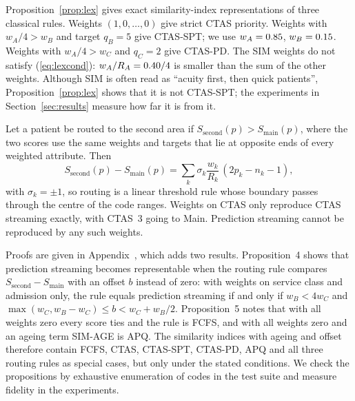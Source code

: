 Proposition~\ref{prop:lex} gives exact similarity-index representations of three classical rules. Weights $(1,0,\dots,0)$ give strict CTAS priority. Weights with $w_A/4>w_B$ and target $q_B=5$ give CTAS-SPT; we use $w_A=0.85$, $w_B=0.15$. Weights with $w_A/4>w_C$ and $q_C=2$ give CTAS-PD. The SIM weights do not satisfy (\ref{eq:lexcond}): $w_A/R_A=0.40/4$ is smaller than the sum of the other weights. Although SIM is often read as ``acuity first, then quick patients'', Proposition~\ref{prop:lex} shows that it is not CTAS-SPT; the experiments in Section~\ref{sec:results} measure how far it is from it.

\begin{proposition}
\label{prop:route}
Let a patient be routed to the second area if $S_{\text{second}}(p)>S_{\text{main}}(p)$, where the two scores use the same weights and targets that lie at opposite ends of every weighted attribute. Then
\begin{equation}
S_{\text{second}}(p)-S_{\text{main}}(p)=\sum_{k}\sigma_k\frac{w_k}{R_k}\,(2p_k-n_k-1),
\end{equation}
with $\sigma_k=\pm 1$, so routing is a linear threshold rule whose boundary passes through the centre of the code ranges. Weights on CTAS only reproduce CTAS streaming exactly, with CTAS~3 going to Main. Prediction streaming cannot be reproduced by any such weights.
\end{proposition}


Proofs are given in Appendix~, which adds two results. Proposition~4 shows that prediction streaming becomes representable when the routing rule compares $S_{\text{second}}-S_{\text{main}}$ with an offset $b$ instead of zero: with weights on service class and admission only, the rule equals prediction streaming if and only if $w_B<4w_C$ and $\max(w_C,w_B-w_C)\le b<w_C+w_B/2$. Proposition~5 notes that with all weights zero every score ties and the rule is FCFS, and with all weights zero and an ageing term SIM-AGE is APQ. The similarity indices with ageing and offset therefore contain FCFS, CTAS, CTAS-SPT, CTAS-PD, APQ and all three routing rules as special cases, but only under the stated conditions. We check the propositions by exhaustive enumeration of codes in the test suite and measure fidelity in the experiments.
